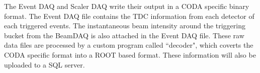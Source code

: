 \documentclass[../main.tex]{subfiles}
\begin{document}
The Event DAQ and Scaler DAQ write their output in a CODA specific binary format. The Event
DAQ file contains the TDC information from each detector of each triggered events. The instantaneous
beam intensity around the triggering bucket from the BeamDAQ is also attached in the Event DAQ file.
These raw data files are processed by a custom program called ``decoder", which coverts the
CODA specific format into a ROOT based format. These information will also be uploaded to a SQL
server.

\ifSubfilesClassLoaded{ \printbibliography[heading=bibintoc,title={References}]}{}
\end{document}
